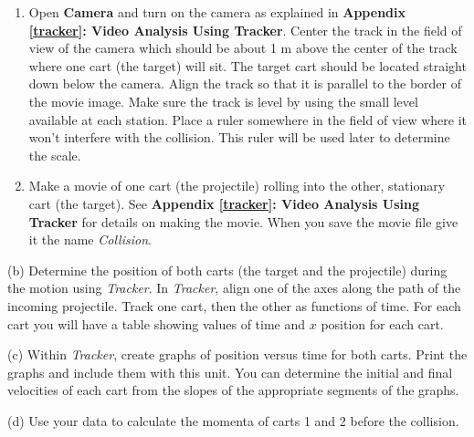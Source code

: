 \begin{enumerate}
\item Open \textbf{Camera} and turn on the camera as explained in \textbf{Appendix \ref{tracker}: Video Analysis Using Tracker}. Center the track in the field of view of the 
camera which should be about 1 m above the center of the track where one cart (the target) will
sit. The target cart should be located straight down below the camera. Align the track so that it is parallel to the border of the movie image. Make sure the track is level by using the small level available at each station. Place a ruler somewhere in the field of view where it won't interfere with the collision. This ruler will be used later to determine the scale. 
\item Make a movie of one cart (the projectile) rolling into the other, stationary
cart (the target). See \textbf{Appendix \ref{tracker}: Video Analysis Using Tracker} for details on making the movie. When you save the movie file give it the name \textit{Collision}.
\end{enumerate}
(b) Determine the position of both carts (the target and the projectile) during
the motion using \textit{Tracker}. In \textit{Tracker}, align one of the axes along the path 
of the incoming projectile. Track one cart, then the other as functions of time. For each cart 
you will have a table showing values of time and $x$ position for each cart.

(c) Within \textit{Tracker}, create graphs of position versus time for both carts. Print the 
graphs and include them with this unit. You can determine the initial and final velocities 
of each cart from the slopes of the appropriate segments of the graphs.

(d) Use your data to calculate the momenta of carts 1 and 2 before the collision.
\vspace{25mm}

